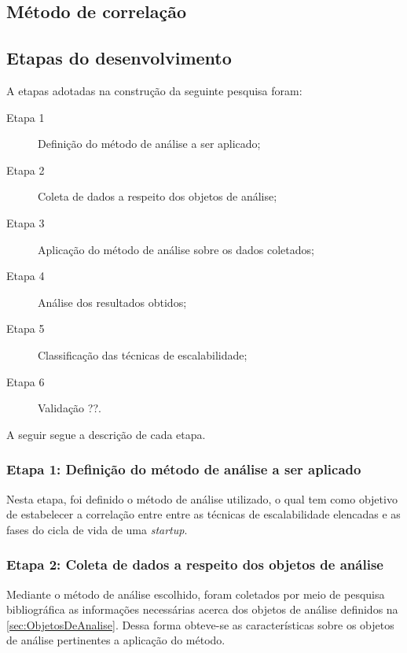 \subsection{Método de correlação}

\subsection{Etapas do desenvolvimento}
\label{sec:EtapasDoDesenvolvimento}

A etapas adotadas na construção da seguinte pesquisa foram:

    \begin{description}
        \item [Etapa 1] Definição do método de análise a ser aplicado;
        \item [Etapa 2] Coleta de dados a respeito dos objetos de análise;
        \item [Etapa 3] Aplicação do método de análise sobre os dados coletados;
        \item [Etapa 4] Análise dos resultados obtidos;
        \item [Etapa 5] Classificação das técnicas de escalabilidade;
        \item [Etapa 6] Validação ??.
    \end{description}

A seguir segue a descrição de cada etapa.

\subsubsection{Etapa 1: Definição do método de análise a ser aplicado}

Nesta etapa, foi definido o método de análise utilizado, o qual tem como objetivo de estabelecer
a correlação entre entre as técnicas de escalabilidade elencadas e as fases do cicla de vida de uma
\textit{startup}.

\subsubsection{Etapa 2: Coleta de dados a respeito dos objetos de análise}
\label{sec:Etapa2}

Mediante o método de análise escolhido, foram coletados por meio de pesquisa bibliográfica as
informações necessárias acerca dos objetos de análise definidos na \autoref{sec:ObjetosDeAnalise}.
Dessa forma obteve-se as características sobre os objetos de análise pertinentes a aplicação do método.

